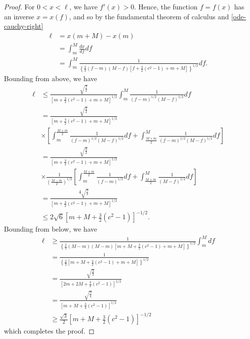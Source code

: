 \documentclass[12pt,reqno]{amsart}
\numberwithin{equation}{section}  %
\begin{document}
\begin{proof}
For $0 < x < \ell$, we have $f'(x) > 0$. Hence, the function $f = f(x)$ has an
inverse $x = x(f)$, and so by the fundamental theorem of calculus and
\eqref{ode-cauchy-right}
%
%
\begin{equation*}
\begin{split}
\ell & = x(m + M) - x(m)
\\
& = \int_{m}^{M} \frac{dx}{df} df
\\
& = \int_{m}^{M} \frac{1}{ \left\{ \frac{2}{3}(f-m)(M-f)
\left[ f +
\frac{3}{2}(c^{2}-1) + m + M \right] \right\}^{1/2}} df.
\end{split}
\end{equation*}
%
%
Bounding from above, we have
%
%
\begin{equation*}
\begin{split}
\ell
& \le \frac{\sqrt{\frac{3}{2}}}{\left[ m + \frac{3}{2}(c^{2}-1) + m + M
\right]^{1/2}} \int_{m}^{M} \frac{1}{(f-m)^{1/2}(M-f)^{1/2}}df
\\
& = \frac{\sqrt{\frac{3}{2}}}
{\left[ m + \frac{3}{2}(c^{2}-1) + m + M
\right]^{1/2}} 
\\
& \times \left[ \int_{m}^{\frac{M+m}{2}} \frac{1}{(f-m)^{1/2}(M-f)^{1/2}}df 
+ \int_{\frac{M+m}{2}}^{M} \frac{1}{(f-m)^{1/2}(M-f)^{1/2}}df
\right]
\\
& = \frac{\sqrt{\frac{3}{2}}}
{\left[ m + \frac{3}{2}(c^{2}-1) + m + M
\right]^{1/2}} 
\\
& \times \frac{1}{\left( \frac{M-m}{2} \right)^{1/2}} \left[ \int_{m}^{\frac{M+m}{2}} \frac{1}{(f-m)^{1/2}}df 
+ \int_{\frac{M+m}{2}}^{M} \frac{1}{(M-f)^{1/2}}df
\right]
\\
& = \frac{4 \sqrt{\frac{3}{2}}}
{\left[ m + \frac{3}{2}(c^{2}-1) + m + M
\right]^{1/2}} 
\\
& \le 2 \sqrt{6} \left [m+M + \frac{3}{2} (c^{2} -1) \right ]^{-1/2}.
\end{split}
\end{equation*}
%
%
Bounding from below, we have
%
%
\begin{equation*}
\begin{split}
\ell
& \ge  \frac{1}{ \left\{ \frac{2}{3}(M-m)(M-m)
\left[ m + M +
\frac{3}{2}(c^{2}-1) + m + M \right] \right\}^{1/2}} \int_{m}^{M} df
\\
& = \frac{1}{\left\{ \frac{2}{3}
\left[ m + M +
\frac{3}{2}(c^{2}-1) + m + M \right] \right\}^{1/2}} 
\\
& = \frac{\sqrt{\frac{3}{2}}}{\left[ 2m + 2M 
+ \frac{3}{2}(c^{2}-1) \right]^{1/2}} 
\\
& = \frac{\sqrt{\frac{3}{4}}}{\left[ m + M 
+ \frac{3}{4}(c^{2}-1) \right]^{1/2}} 
\\
& \ge \frac{\sqrt{3}}{2} \left[ m + M 
+ \frac{3}{2}(c^{2}-1) \right]^{-1/2}
\end{split}
\end{equation*}
%
%
which completes the proof.
\end{proof}
\end{document}
